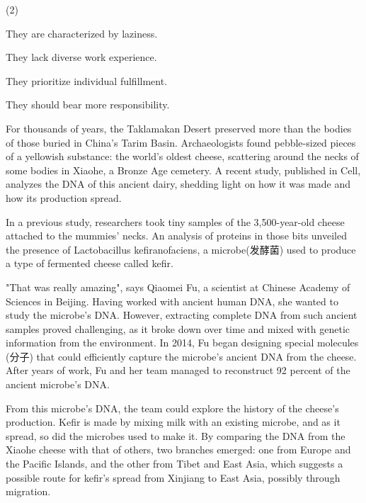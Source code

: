 \documentclass{英语试卷}
\begin{document}
\begin{choices}(2)
  \item They are characterized by laziness.
  \item They lack diverse work experience.
  \item They prioritize individual fulfillment.
  \item They should bear more responsibility.
\end{choices}
\par For thousands of years, the Taklamakan Desert preserved more than the bodies of those buried in China's Tarim Basin. Archaeologists found pebble-sized pieces of a yellowish substance: the world's oldest cheese, scattering around the necks of some bodies in Xiaohe, a Bronze Age cemetery. A recent study, published in Cell, analyzes the DNA of this ancient dairy, shedding light on how it was made and how its production spread.\par
\par In a previous study, researchers took tiny samples of the 3,500-year-old cheese attached to the mummies' necks. An analysis of proteins in those bits unveiled the presence of Lactobacillus kefiranofaciens, a microbe(发酵菌) used to produce a type of fermented cheese called kefir.\par
\par "That was really amazing", says Qiaomei Fu, a scientist at Chinese Academy of Sciences in Beijing. Having worked with ancient human DNA, she wanted to study the microbe’s DNA. However, extracting complete DNA from such ancient samples proved challenging, as it broke down over time and mixed with genetic information from the environment. In 2014, Fu began designing special molecules (分子) that could efficiently capture the microbe's ancient DNA from the cheese. After years of work, Fu and her team managed to reconstruct 92 percent of the ancient microbe’s DNA.\par
\par From this microbe's DNA, the team could explore the history of the cheese's production. Kefir is made by mixing milk with an existing microbe, and as it spread, so did the microbes used to make it. By comparing the DNA from the Xiaohe cheese with that of others, two branches emerged: one from Europe and the Pacific Islands, and the other from Tibet and East Asia, which suggests a possible route for kefir's spread from Xinjiang to East Asia, possibly through migration.\par
\end{document}
